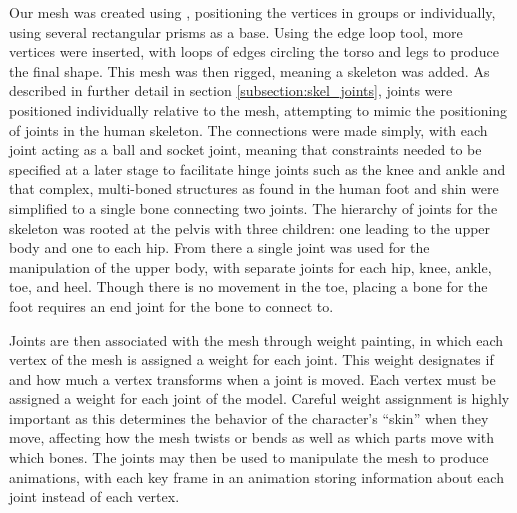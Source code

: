 Our mesh was created using \maya{}, positioning the vertices in groups or individually, using several rectangular prisms as a base.  Using the edge loop tool, more vertices were inserted, with loops of edges circling the torso and legs to produce the final shape.  This mesh was then rigged, meaning a skeleton was added.  As described in further detail in section \ref{subsection:skel_joints}, joints were positioned individually relative to the mesh, attempting to mimic the positioning of joints in the human skeleton.  The connections were made simply, with each joint acting as a ball and socket joint, meaning that constraints needed to be specified at a later stage to facilitate hinge joints such as the knee and ankle and that complex, multi-boned structures as found in the human foot and shin were simplified to a single bone connecting two joints.  The hierarchy of joints for the skeleton was rooted at the pelvis with three children: one leading to the upper body and one to each hip.  From there a single joint was used for the manipulation of the upper body, with separate joints for each hip, knee, ankle, toe, and heel.  Though there is no movement in the toe, placing a bone for the foot requires an end joint for the bone to connect to.

Joints are then associated with the mesh through weight painting, in which each vertex of the mesh is assigned a weight for each joint.  This weight designates if and how much a vertex transforms when a joint is moved.  Each vertex must be assigned a weight for each joint of the model.  Careful weight assignment is highly important as this determines the behavior of the character's ``skin'' when they move, affecting how the mesh twists or bends as well as which parts move with which bones.  The joints may then be used to manipulate the mesh to produce animations, with each key frame in an animation storing information about each joint instead of each vertex. %

